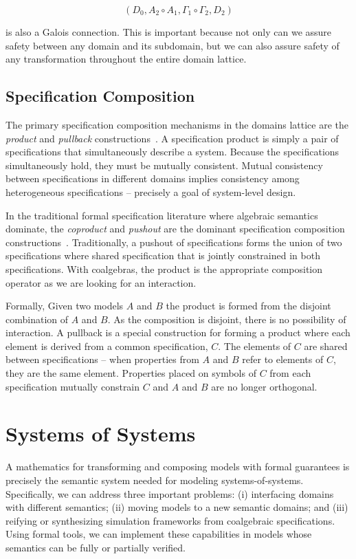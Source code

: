 \documentclass[12pt]{article}
\begin{document}
\[(D_0, A_2 \circ A_1, \Gamma_1 \circ \Gamma_2, D_2)\]

\noindent is also a Galois connection.  This is important because not
only can we assure safety between any domain and its subdomain, but we
can also assure safety of any transformation throughout the entire
domain lattice.

\subsection{Specification Composition}

The primary specification composition mechanisms in the domains
lattice are the \emph{product} and \emph{pullback}
constructions~\cite{Ehrig:85:Fundamentals-of}.  A specification
product is simply a pair of specifications that simultaneously
describe a system.  Because the specifications simultaneously hold,
they must be mutually consistent.  Mutual consistency between
specifications in different domains implies consistency among
heterogeneous specifications -- precisely a goal of system-level
design.

In the traditional formal specification literature where algebraic
semantics dominate, the \emph{coproduct} and \emph{pushout} are the
dominant specification composition
constructions~\cite{Ehrig:85:Fundamentals-of,Smith:93:Constructing-Sp,Smith:90:KIDS:-A-Semiaut}.
Traditionally, a pushout of specifications forms the union of two
specifications where shared specification that is jointly constrained
in both specifications.  With coalgebras, the product is the
appropriate composition operator as we are looking for an interaction.

Formally, Given two models $A$ and $B$ the product is formed from the
disjoint combination of $A$ and $B$. As the composition is disjoint,
there is no possibility of interaction.  A pullback is a special
construction for forming a product where each element is derived from
a common specification, $C$.  The elements of $C$ are shared between
specifications -- when properties from $A$ and $B$ refer to elements
of $C$, they are the same element.  Properties placed on symbols of
$C$ from each specification mutually constrain $C$ and $A$ and $B$ are
no longer orthogonal.

\section{Systems of Systems}

A mathematics for transforming and composing models with formal
guarantees is precisely the semantic system needed for modeling
systems-of-systems.  Specifically, we can address three important
problems: (i) interfacing domains with different semantics; (ii)
moving models to a new semantic domains; and (iii) reifying or
synthesizing simulation frameworks from coalgebraic specifications.
Using formal tools, we can implement these capabilities in models
whose semantics can be fully or partially verified.
\end{document}
